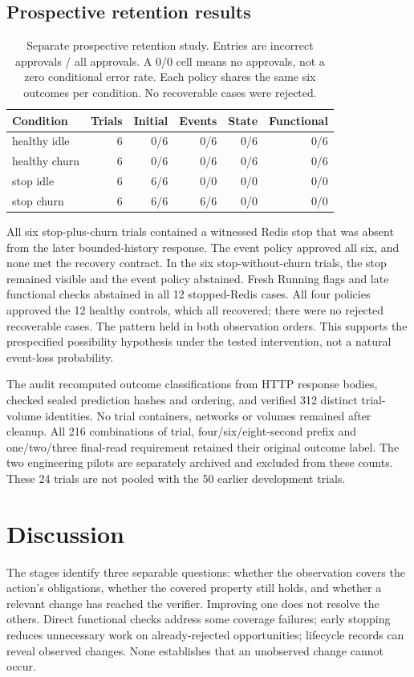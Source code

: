 \documentclass[manuscript,review,nonacm]{acmart}
\begin{document}
\subsection{Prospective retention results}
\begin{table}[t]
\caption{Separate prospective retention study. Entries are incorrect approvals / all approvals. A 0/0 cell means no approvals, not a zero conditional error rate. Each policy shares the same six outcomes per condition. No recoverable cases were rejected.}
\label{tab:condition-4-6}
\centering
\begin{tabularx}{\linewidth}{@{}Xrrrrr@{}}
\toprule
Condition & Trials & Initial & Events & State & Functional \\
\midrule
healthy idle & 6 & 0/6 & 0/6 & 0/6 & 0/6 \\
healthy churn & 6 & 0/6 & 0/6 & 0/6 & 0/6 \\
stop idle & 6 & 6/6 & 0/0 & 0/0 & 0/0 \\
stop churn & 6 & 6/6 & 6/6 & 0/0 & 0/0 \\
\bottomrule
\end{tabularx}
\end{table}
All six stop-plus-churn trials contained a witnessed Redis stop that was absent from the later bounded-history response. The event policy approved all six, and none met the recovery contract. In the six stop-without-churn trials, the stop remained visible and the event policy abstained. Fresh Running flags and late functional checks abstained in all 12 stopped-Redis cases. All four policies approved the 12 healthy controls, which all recovered; there were no rejected recoverable cases. The pattern held in both observation orders. This supports the prespecified possibility hypothesis under the tested intervention, not a natural event-loss probability.

The audit recomputed outcome classifications from HTTP response bodies, checked sealed prediction hashes and ordering, and verified 312 distinct trial-volume identities. No trial containers, networks or volumes remained after cleanup. All 216 combinations of trial, four/six/eight-second prefix and one/two/three final-read requirement retained their original outcome label. The two engineering pilots are separately archived and excluded from these counts. These 24 trials are not pooled with the 50 earlier development trials.

\section{Discussion}
The stages identify three separable questions: whether the observation covers the action's obligations, whether the covered property still holds, and whether a relevant change has reached the verifier. Improving one does not resolve the others. Direct functional checks address some coverage failures; early stopping reduces unnecessary work on already-rejected opportunities; lifecycle records can reveal observed changes. None establishes that an unobserved change cannot occur.
\end{document}
